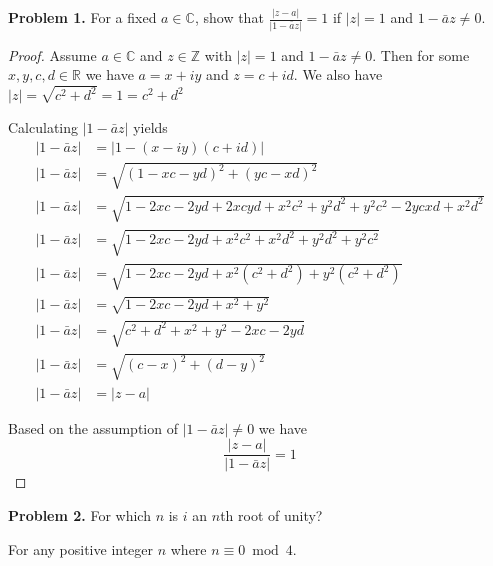 \documentclass[letter,12pt]{article}
\date{\today}
\begin{document}
\pagestyle{fancy}
\begin{tcolorbox}
    \textbf{Problem 1.} For a fixed $a\in \mathbb{C}$, show that $\frac{|z-a|}{|1-\bar{a}z|}=1$ if $|z|=1$ and $1-\bar{a}z\not = 0$.

\end{tcolorbox}

\begin{proof}
    Assume $a\in \mathbb{C}$ and $z\in \mathbb{Z}$ with $|z|=1$ and $1-\bar{a}z\not = 0$. Then for some $x,y,c,d\in \mathbb{R}$ we have $a=x+iy$ and $z=c+id$. We also have $|z|=\sqrt{c^2+d^2}=1=c^2+d^2$

    Calculating $|1-\bar{a}z|$ yields \begin{align*}
        |1-\bar{a}z| & = |1-(x-iy)(c+id)|                                         \\
        |1-\bar{a}z| & = \sqrt{(1-xc-yd)^2+(yc-xd)^2}                             \\
        |1-\bar{a}z| & = \sqrt{1-2xc-2yd+2xcyd+x^2c^2+y^2d^2+y^2c^2-2ycxd+x^2d^2} \\
        |1-\bar{a}z| & =\sqrt{1-2xc-2yd+x^2c^2+x^2d^2+y^2d^2+y^2c^2}              \\
        |1-\bar{a}z| & =\sqrt{1-2xc-2yd+x^2(c^2+d^2)+y^2(c^2+d^2)}                \\
        |1-\bar{a}z| & =\sqrt{1-2xc-2yd+x^2+y^2}                                  \\
        |1-\bar{a}z| & =\sqrt{c^2+d^2+x^2+y^2-2xc-2yd}                            \\
        |1-\bar{a}z| & =\sqrt{(c-x)^2+(d-y)^2}                                    \\
        |1-\bar{a}z| & =|z-a|
    \end{align*}

    Based on the assumption of $|1-\bar{a}z|\not = 0$ we have $$\frac{|z-a|}{|1-\bar{a}z|}=1$$

\end{proof}

\begin{tcolorbox}
    \textbf{Problem 2.} For which $n$ is $i$ an $n$th root of unity?
\end{tcolorbox}
For any positive integer $n$ where $n\equiv 0\bmod 4$.
\end{document}
